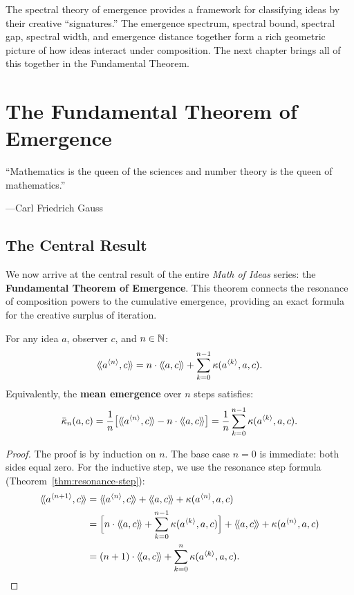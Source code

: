 The spectral theory of emergence provides a framework for classifying ideas
by their creative ``signatures.'' The emergence spectrum, spectral bound,
spectral gap, spectral width, and emergence distance together form a rich
geometric picture of how ideas interact under composition. The next chapter
brings all of this together in the Fundamental Theorem.



\chapter{The Fundamental Theorem of Emergence}
\label{ch:fundamental}

\epigraph{``Mathematics is the queen of the sciences and number theory
is the queen of mathematics.''}
{---Carl Friedrich Gauss}


\section{The Central Result}

We now arrive at the central result of the entire \emph{Math of Ideas} series:
the \textbf{Fundamental Theorem of Emergence}. This theorem connects the
resonance of composition powers to the cumulative emergence, providing an exact
formula for the creative surplus of iteration.

\begin{theorem}
\label{thm:fundamental}
For any idea $a$, observer $c$, and $n \in \mathbb{N}$:
\[
  \langle\!\langle a^{\langle n \rangle}, c \rangle\!\rangle = n \cdot \langle\!\langle a, c \rangle\!\rangle + \sum_{k=0}^{n-1} \kappa(a^{\langle k \rangle}, a, c).
\]
Equivalently, the \textbf{mean emergence} over $n$ steps satisfies:
\[
  \bar{\kappa}_n(a,c) = \frac{1}{n}\bigl[\langle\!\langle a^{\langle n \rangle}, c \rangle\!\rangle - n \cdot \langle\!\langle a, c \rangle\!\rangle\bigr]
  = \frac{1}{n} \sum_{k=0}^{n-1} \kappa(a^{\langle k \rangle}, a, c).
\]
\end{theorem}

\begin{proof}
The proof is by induction on $n$. The base case $n=0$ is immediate: both sides
equal zero. For the inductive step, we use the resonance step formula
(Theorem~\ref{thm:resonance-step}):
\begin{align*}
\rs{\compN{a}{n+1}}{c} &= \rs{\compN{a}{n}}{c} + \rs{a}{c} + \emerge(\compN{a}{n}, a, c) \\
&= \Bigl[n \cdot \rs{a}{c} + \sum_{k=0}^{n-1}\emerge(\compN{a}{k},a,c)\Bigr]
  + \rs{a}{c} + \emerge(\compN{a}{n}, a, c) \\
&= (n+1) \cdot \rs{a}{c} + \sum_{k=0}^{n}\emerge(\compN{a}{k},a,c). \qedhere
\end{align*}
\end{proof}

